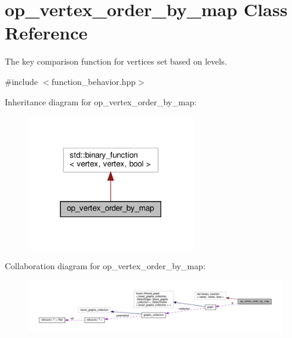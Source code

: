 \hypertarget{classop__vertex__order__by__map}{}\section{op\+\_\+vertex\+\_\+order\+\_\+by\+\_\+map Class Reference}
\label{classop__vertex__order__by__map}


The key comparison function for vertices set based on levels.  




{\ttfamily \#include $<$function\+\_\+behavior.\+hpp$>$}



Inheritance diagram for op\+\_\+vertex\+\_\+order\+\_\+by\+\_\+map\+:
\nopagebreak
\begin{figure}[H]
\begin{center}
\leavevmode
\includegraphics[width=206pt]{de/d73/classop__vertex__order__by__map__inherit__graph}
\end{center}
\end{figure}


Collaboration diagram for op\+\_\+vertex\+\_\+order\+\_\+by\+\_\+map\+:
\nopagebreak
\begin{figure}[H]
\begin{center}
\leavevmode
\includegraphics[width=350pt]{db/d3a/classop__vertex__order__by__map__coll__graph}
\end{center}
\end{figure}
